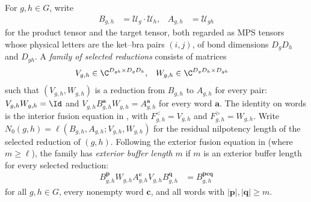 \begin{definition}
    \label{def:mpug_pair_reductions}
    \leanok
    For $g,h\in G$, write
    \begin{align}
        B_{g,h} & =\mathcal U_g\mathbin{\cdot}\mathcal U_h,
                & A_{g,h}                                   & =\mathcal U_{gh}
        \label{eq:mpug_pair_tensors}
    \end{align}
    for the product tensor and the target tensor, both regarded as MPS
    tensors whose physical letters are the ket--bra pairs $(i,j)$, of bond
    dimensions $D_gD_h$ and $D_{gh}$.  A \emph{family of selected reductions}
    consists of matrices
    \begin{align}
        V_{g,h} & \in\C^{D_{gh}\times D_gD_h},
                & W_{g,h}                      & \in\C^{D_gD_h\times D_{gh}}
        \label{eq:mpug_pair_reduction_matrices}
    \end{align}
    such that $(V_{g,h},W_{g,h})$ is a reduction from $B_{g,h}$ to $A_{g,h}$
    for every pair: $V_{g,h}W_{g,h}=\Id$ and
    $V_{g,h}B_{g,h}^{\mathbf a}W_{g,h}=A_{g,h}^{\mathbf a}$ for every word
    $\mathbf a$.  The identity on words is the interior fusion equation in
    \cite[equation labelled \emph{eq:fusion\_2}, lines 1459--1497]
    {FrancoRubio2025MPUGauging}, with $F^<_{g,h}=V_{g,h}$ and
    $F^>_{g,h}=W_{g,h}$.    Write $N_0(g,h)=\ell(B_{g,h},A_{g,h};V_{g,h},W_{g,h})$ for the residual
    nilpotency length of the selected reduction of $(g,h)$. Following the
    exterior fusion equation in
    \cite[equation labelled \emph{eq:fusion\_1}, lines 1406--1457, with the
        quantifiers on line 1498]{FrancoRubio2025MPUGauging} (where
    $m\geq\ell$), the family has \emph{exterior buffer length} $m$ if $m$ is an
    exterior buffer length for every selected reduction:
    \begin{align}
        B_{g,h}^{\mathbf p}W_{g,h}A_{g,h}^{\mathbf c}V_{g,h}B_{g,h}^{\mathbf q}
         & =B_{g,h}^{\mathbf p\mathbf c\mathbf q}
        \label{eq:mpug_pair_exterior_identity}
    \end{align}
    for all $g,h\in G$, every nonempty word $\mathbf c$, and all words with
    $|\mathbf p|,|\mathbf q|\geq m$.
\end{definition}

